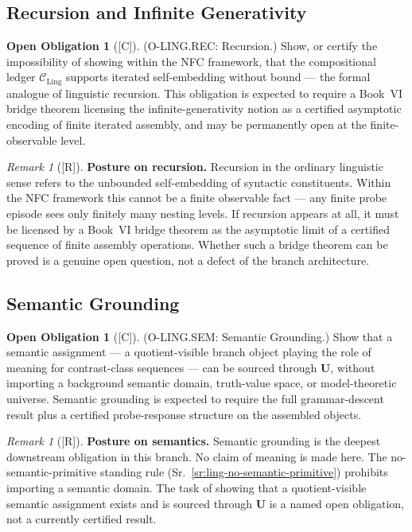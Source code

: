 \documentclass[12pt,oneside]{amsbook}
\theoremstyle{plain}
\theoremstyle{definition}
\newtheorem{obligation}[theorem]{Open Obligation}
\theoremstyle{remark}
\newtheorem{remark}[theorem]{Remark}
\newcommand{\status}[1]{\textup{[#1]}}
\begin{document}
\subsection{Recursion and Infinite Generativity}\label{sec:ling-REC}

\begin{obligation}[\status{C}]\label{ob:ling-REC}
\textup{(O-LING.REC: Recursion.)}
Show, or certify the impossibility of showing within the NFC framework,
that the compositional ledger $\mathcal{C}_{\mathrm{Ling}}$ supports
iterated self-embedding without bound --- the formal analogue of
linguistic recursion. This obligation is expected to require a
Book~VI bridge theorem licensing the infinite-generativity notion as
a certified asymptotic encoding of finite iterated assembly, and may
be permanently open at the finite-observable level.
\end{obligation}

\begin{remark}[\status{R}]\label{rem:ling-rec-posture}
\textbf{Posture on recursion.}
Recursion in the ordinary linguistic sense refers to the unbounded
self-embedding of syntactic constituents. Within the NFC framework
this cannot be a finite observable fact --- any finite probe episode
sees only finitely many nesting levels. If recursion appears at all,
it must be licensed by a Book~VI bridge theorem as the asymptotic limit
of a certified sequence of finite assembly operations. Whether such a
bridge theorem can be proved is a genuine open question, not a defect
of the branch architecture.
\end{remark}

\subsection{Semantic Grounding}\label{sec:ling-SEM}

\begin{obligation}[\status{C}]\label{ob:ling-SEM}
\textup{(O-LING.SEM: Semantic Grounding.)}
Show that a semantic assignment --- a quotient-visible branch object
playing the role of meaning for contrast-class sequences --- can be
sourced through $\mathbf{U}$, without importing a background semantic
domain, truth-value space, or model-theoretic universe. Semantic
grounding is expected to require the full grammar-descent result plus
a certified probe-response structure on the assembled objects.
\end{obligation}

\begin{remark}[\status{R}]\label{rem:ling-sem-posture}
\textbf{Posture on semantics.}
Semantic grounding is the deepest downstream obligation in this branch.
No claim of meaning is made here. The no-semantic-primitive standing
rule (Sr.~\ref{sr:ling-no-semantic-primitive}) prohibits importing a
semantic domain. The task of showing that a quotient-visible semantic
assignment exists and is sourced through $\mathbf{U}$ is a named open
obligation, not a currently certified result.
\end{remark}
\end{document}
